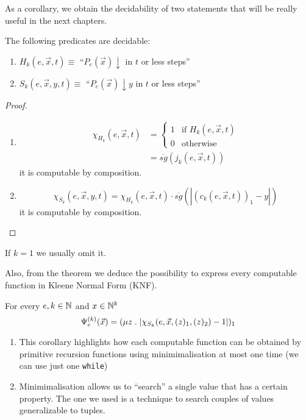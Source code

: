 As a corollary, we obtain the decidability of two statements that will
be really useful in the next chapters.
\begin{corollary}
  The following predicates are decidable:
  \begin{enumerate}[label=(\alph*)]
  \item $H_k(e, \vec{x}, t) \equiv$ ``$P_e(\vec{x})\downarrow$ in $t$
    or less steps''
  \item $S_k(e, \vec{x}, y, t) \equiv$ ``$P_e(\vec{x})\downarrow y$ in
    $t$ or less steps''
  \end{enumerate}
  \begin{proof}
    \begin{enumerate}[label=(\alph*)]
    \item 
      \begin{align*}
        \chi_{H_k}(e, \vec{x}, t) &= 
        \begin{cases}
          1 & \mbox{if } H_k(e, \vec{x}, t)\\
          0 & \mbox{otherwise}
        \end{cases} \\
        &= \overline{sg}(j_k(e,\vec{x},t))
      \end{align*}
      it is computable by composition.
    \item \[
      \chi_{S_k}(e, \vec{x}, y, t) = \chi_{H_k}(e, \vec{x}, t) 
      \cdot \overline{sg}(|(c_k(e,\vec{x},t))_1 - y|) 
    \]
    it is computable by composition.
    \end{enumerate}
  \end{proof}
  If $k=1$ we usually omit it.
\end{corollary}

Also, from the theorem we deduce the possibility to express every
computable function in Kleene Normal Form (KNF).
\begin{corollary}
  For every $e,k \in \mathbb{N}$ and $x \in \mathbb{N}^k$
  \[
    \Psi_e^{(k)} (\vec{x}) = (\mu z \;.\; |\chi_{S_k}(e, \vec{x}, (z)_1, (z)_2) - 1|)_1
  \]
\end{corollary}

\begin{observation}
  \begin{enumerate}[label=\roman*.]
    \item This corollary highlights how each computable function can be obtained by primitive recursion
      functions using minimimalisation at most one time (we can use just one
      \texttt{while})
    \item Minimimalisation allows us to ``search'' a single value that has a
      certain property. The one we used is a technique to search couples
      of values generalizable to tuples.
    \end{enumerate}
\end{observation}


